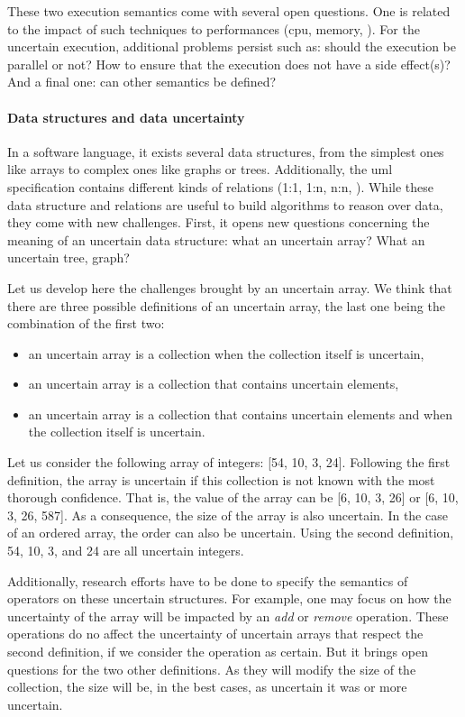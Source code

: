 These two execution semantics come with several open questions.
One is related to the impact of such techniques to performances (\gls{cpu}, memory, \etc{}).
For the uncertain execution, additional problems persist such as: should the execution be parallel or not? How to ensure that the execution does not have a side effect(s)?
And a final one: can other semantics be defined?

\paragraph{Data structures and data uncertainty}
In a software language, it exists several data structures, from the simplest ones like arrays to complex ones like graphs or trees.
Additionally, the \gls{uml} specification contains different kinds of relations (1:1, 1:n, n:n, \etc{}).
While these data structure and relations are useful to build algorithms to reason over data, they come with new challenges.
First, it opens new questions concerning the meaning of an uncertain data structure: what an uncertain array? What an uncertain tree, graph?

Let us develop here the challenges brought by an uncertain array.
We think that there are three possible definitions of an uncertain array, the last one being the combination of the first two:
\begin{itemize}
	\item an uncertain array is a collection when the collection itself is uncertain,
	\item an uncertain array is a collection that contains uncertain elements,
	\item an uncertain array is a collection that contains uncertain elements and when the collection itself is uncertain.
\end{itemize}
Let us consider the following array of integers: [54, 10, 3, 24]. 
Following the first definition, the array is uncertain if this collection is not known with the most thorough confidence.
That is, the value of the array can be [6, 10, 3, 26] or [6, 10, 3, 26, 587].
As a consequence, the size of the array is also uncertain.
In the case of an ordered array, the order can also be uncertain.
Using the second definition, 54, 10, 3, and 24 are all uncertain integers.

Additionally, research efforts have to be done to specify the semantics of operators on these uncertain structures.
For example, one may focus on how the uncertainty of the array will be impacted by an \textit{add} or \textit{remove} operation.
These operations do no affect the uncertainty of uncertain arrays that respect the second definition, if we consider the operation as certain.
But it brings open questions for the two other definitions.
As they will modify the size of the collection, the size will be, in the best cases, as uncertain it was or more uncertain.

